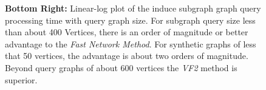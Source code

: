 \begin{figure}[h]
{\textbf{Bottom Right:} Linear-log plot of the induce subgraph graph query processing time with query graph size. For subgraph query size less than about 400 Vertices, there is an order of magnitude or better advantage to the \textit{Fast Network Method}. For synthetic graphs of less that 50 vertices, the advantage is about two orders of magnitude. Beyond query graphs of about 600 vertices the \textit{VF2} method is superior.
}
\label{fig:fig91}
\end{figure}
%





